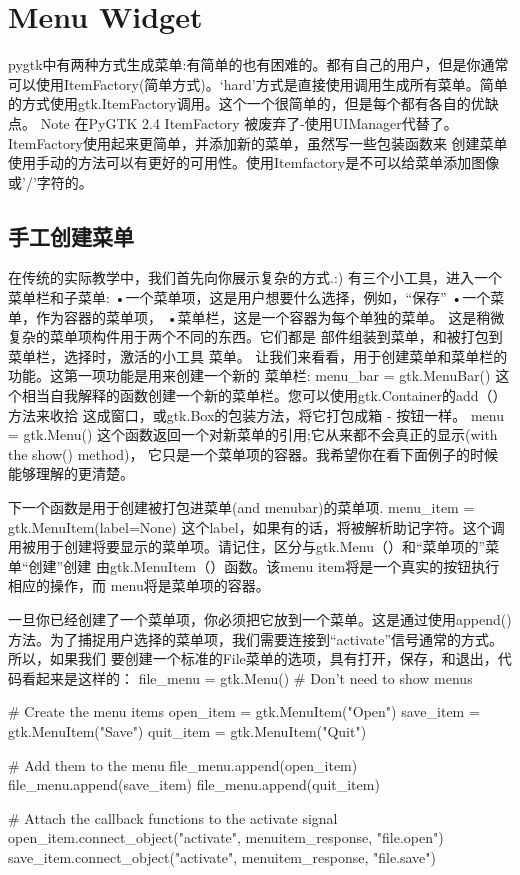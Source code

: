 \chapter{Menu Widget}
pygtk中有两种方式生成菜单:有简单的也有困难的。都有自己的用户，但是你通常可以使用ItemFactory(简单方式)。‘hard’方式是直接使用调用生成所有菜单。简单的方式使用gtk.ItemFactory调用。这个一个很简单的，但是每个都有各自的优缺点。
Note
在PyGTK 2.4 ItemFactory 被废弃了-使用UIManager代替了。
ItemFactory使用起来更简单，并添加新的菜单，虽然写一些包装函数来
创建菜单使用手动的方法可以有更好的可用性。使用Itemfactory是不可以给菜单添加图像或'/'字符的。
\section{手工创建菜单} %
在传统的实际教学中，我们首先向你展示复杂的方式.:)
有三个小工具，进入一个菜单栏和子菜单:
•一个菜单项，这是用户想要什么选择，例如，“保存”
•一个菜单，作为容器的菜单项，
•菜单栏，这是一个容器为每个单独的菜单。
这是稍微复杂的菜单项构件用于两个不同的东西。它们都是
部件组装到菜单，和被打包到菜单栏，选择时，激活的小工具
菜单。
让我们来看看，用于创建菜单和菜单栏的功能。这第一项功能是用来创建一个新的
菜单栏:
menu_bar = gtk.MenuBar()
这个相当自我解释的函数创建一个新的菜单栏。您可以使用gtk.Container的add（）方法来收拾
这成窗口，或gtk.Box的包装方法，将它打包成箱 - 按钮一样。
menu = gtk.Menu()
这个函数返回一个对新菜单的引用;它从来都不会真正的显示(with the show() method)，
它只是一个菜单项的容器。我希望你在看下面例子的时候能够理解的更清楚。

下一个函数是用于创建被打包进菜单(and menubar)的菜单项.
menu_item = gtk.MenuItem(label=None)
这个label，如果有的话，将被解析助记字符。这个调用被用于创建将要显示的菜单项。请记住，区分与gtk.Menu（）和“菜单项的”菜单“创建”创建
由gtk.MenuItem（）函数。该menu item将是一个真实的按钮执行相应的操作，而
menu将是菜单项的容器。

一旦你已经创建了一个菜单项，你必须把它放到一个菜单。这是通过使用append()方法。为了捕捉用户选择的菜单项，我们需要连接到“activate”信号通常的方式。所以，如果我们
要创建一个标准的File菜单的选项，具有打开，保存，和退出，代码看起来是这样的：
file_menu = gtk.Menu()	# Don't need to show menus

# Create the menu items
open_item = gtk.MenuItem("Open")
save_item = gtk.MenuItem("Save")
quit_item = gtk.MenuItem("Quit")

# Add them to the menu
file_menu.append(open_item)
file_menu.append(save_item)
file_menu.append(quit_item)

# Attach the callback functions to the activate signal
open_item.connect_object("activate", menuitem_response, "file.open")
save_item.connect_object("activate", menuitem_response, "file.save")

